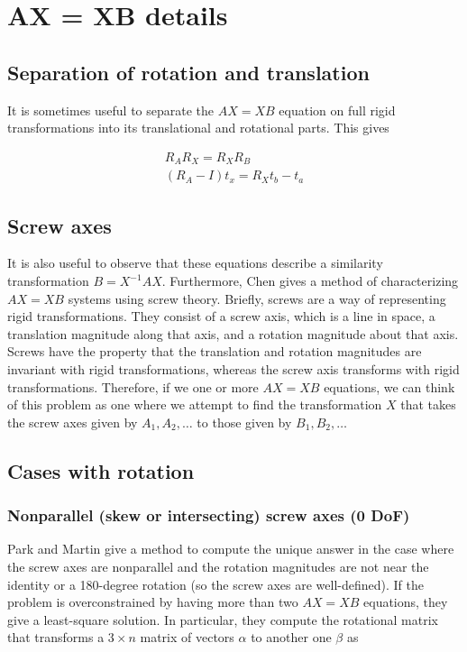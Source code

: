 \section{AX = XB details}
\label{sec:ax-xb_details}

\subsection{Separation of rotation and translation}

It is sometimes useful to separate the $AX = XB$ equation on full rigid transformations into its translational
and rotational parts. This gives

\begin{align}
	R_A R_X = R_X R_B \label{eq:ax-xb_rotation} \\
	\left(R_A - I \right) t_x = R_X t_b - t_a \label{eq:ax-xb_translation}
\end{align}

\subsection{Screw axes}

It is also useful to observe that these equations describe a similarity transformation $B = X^{-1}AX$.
Furthermore, Chen \cite{Chen1991} gives a method of characterizing $AX = XB$ systems using 
screw theory. Briefly, screws are a way of representing rigid transformations. They consist of 
a screw axis, which is a line in space, a translation magnitude along that axis, and a 
rotation magnitude about that axis. Screws have the property that the translation and rotation magnitudes
are invariant with rigid transformations, whereas the screw axis transforms with rigid transformations.
Therefore, if we one or more $AX = XB$ equations, we can think of this problem as one where
we attempt to find the transformation $X$ that takes the screw axes given by $A_1, A_2, \ldots$ 
to those given by $B_1, B_2, \ldots$

\subsection{Cases with rotation}

\subsubsection{Nonparallel (skew or intersecting) screw axes (0 DoF)}

Park and Martin \cite{Park1994} give a method to compute the unique answer in the case where the 
screw axes are nonparallel and the rotation magnitudes are not near the identity or a 180-degree rotation 
(so the screw axes are well-defined). If the problem is overconstrained by having more than two $AX = XB$
equations, they give a least-square solution. In particular, they compute the rotational matrix that 
transforms a $3 \times n$ matrix of vectors $\alpha$ to another one $\beta$ as

